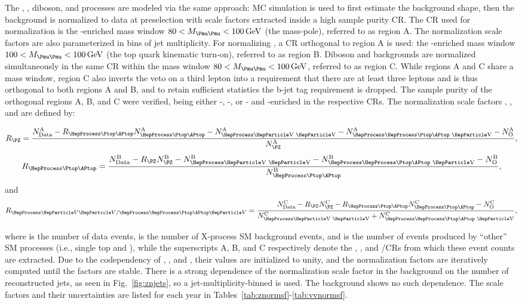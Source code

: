 The \ZJETS, \ttbar, diboson, and \TTV processes are modeled via the same approach: MC simulation is used to first estimate the background shape, then the background is normalized to data at preselection with scale factors extracted inside a high sample purity CR. The CR used for \ZJETS normalization is the \PZ-enriched mass window $80 < \Muu < \SI{100}{\GeV}$ (the \PZ mass-pole), referred to as region A. The \ZJETS normalization scale factors are also parameterized in bins of jet multiplicity. For normalizing \ttbar, a CR orthogonal to region A is used: the \ttbar-enriched mass window $100 < \Muu < \SI{100}{\GeV}$ (the top quark kinematic turn-on), referred to as region B. Diboson and \TTV backgrounds are normalized simultaneously in the same CR within the mass window $80 < \Muu < \SI{100}{\GeV}$, referred to as region C. While regions A and C share a mass window, region C also inverts the veto on a third lepton into a requirement that there are at least three leptons and is thus orthogonal to both regions A and B, and to retain sufficient statistics the b-jet tag requirement is dropped. The sample purity of the orthogonal regions A, B, and C were verified, being either \PZ-, \ttbar-, or \VV- and \TTV-enriched in the respective CRs. The normalization scale factors \RZ, \RTT, and \RVV are defined by:

\begin{equation}
       \RZ = \frac{\NCR{A}{Data} - \RTT\NCR{A}{\ttbar} - \NCR{A}{\VV} - \NCR{A}{\TTV} - \NCR{A}{O}}{\NCR{A}{\PZ}},
\end{equation}
\begin{equation}
       \RTT = \frac{\NCR{B}{Data} - \RZ\NCR{B}{\PZ} - \NCR{B}{\VV} - \NCR{B}{\TTV} - \NCR{B}{O}}{\NCR{B}{\ttbar}},
\end{equation}
and
\begin{equation}
       \RVV = \frac{\NCR{C}{Data} - \RZ\NCR{C}{\PZ} - \RTT\NCR{C}{\ttbar} - \NCR{C}{O}}{\NCR{C}{\VV} + \NCR{C}{\TTV}},
\end{equation}

where  is the number of data events,  is the number of X-process SM background events, and  is the number of events produced by ``other'' SM processes (i.e., single top and \WJETS), while the superscripts A, B, and C respectively denote the \PZ, \ttbar, and \VV/\TTV CRs from which these event counts are extracted. Due to the codependency of \RZ, \RTT, and \RVV, their values are initialized to unity, and the normalization factors are iteratively computed until the factors are stable. There is a strong dependence of the normalization scale factor in the \ZJETS background on the number of reconstructed jets, as seen in Fig.~\ref{fig:znjets}, so a jet-multiplicity-binned \ZJETS is used. The \ttbar background shows no such dependence. The scale factors and their uncertainties are listed for each year in Tables~\ref{tab:znormsf}-\ref{tab:vvnormsf}.

